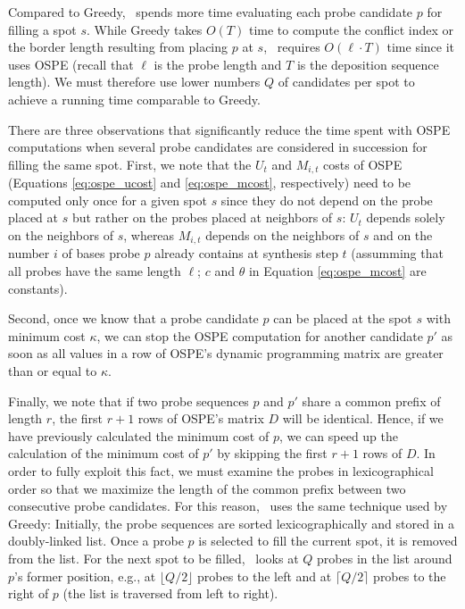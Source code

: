 Compared to Greedy, \Greedyplus\ spends more time evaluating each probe
candidate $p$ for filling a spot $s$. While Greedy takes $O(T)$ time to compute
the conflict index or the border length resulting from placing $p$ at $s$,
\Greedyplus\ requires $O(\ell \cdot T)$ time since it uses OSPE (recall that
$\ell$ is the probe length and $T$ is the deposition sequence length). We must
therefore use lower numbers $Q$ of candidates per spot to achieve a running
time comparable to Greedy.

There are three observations that significantly reduce the time spent with OSPE
computations when several probe candidates are considered in succession for
filling the same spot. First, we note that the $U_t$ and $M_{i,t}$ costs of OSPE
(Equations \ref{eq:ospe_ucost} and \ref{eq:ospe_mcost}, respectively) need to be
computed only once for a given spot $s$ since they do not depend on the probe
placed at $s$ but rather on the probes placed at neighbors of $s$: $U_t$ depends
solely on the neighbors of $s$, whereas $M_{i,t}$ depends on the neighbors of
$s$ and on the number $i$ of bases probe $p$ already contains at synthesis step
$t$ (assumming that all probes have the same length $\ell$; $c$ and $\theta$ in
Equation \ref{eq:ospe_mcost} are constants).

Second, once we know that a probe candidate $p$ can be placed at the spot $s$
with minimum cost $\kappa$, we can stop the OSPE computation for another
candidate $p'$ as soon as all values in a row of OSPE's dynamic programming
matrix are greater than or equal to $\kappa$.

Finally, we note that if two probe sequences $p$ and $p'$ share a common prefix
of length $r$, the first $r + 1$ rows of OSPE's matrix $D$ will be identical.
Hence, if we have previously calculated the minimum cost of $p$, we can speed up
the calculation of the minimum cost of $p'$ by skipping the first $r + 1$ rows
of $D$. In order to fully exploit this fact, we must examine the probes in
lexicographical order so that we maximize the length of the common prefix
between two consecutive probe candidates. For this reason, \Greedyplus\ uses the
same technique used by Greedy: Initially, the probe sequences are sorted
lexicographically and stored in a doubly-linked list. Once a probe $p$ is
selected to fill the current spot, it is removed from the list. For the next
spot to be filled, \Greedyplus\ looks at $Q$ probes in the list around $p$'s
former position, e.g., at $\lfloor Q/2 \rfloor$ probes to the left and at
$\lceil Q/2 \rceil$ probes to the right of $p$ (the list is traversed from left
to right).

